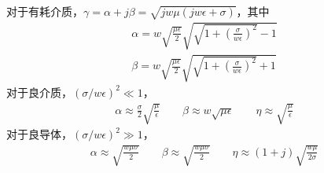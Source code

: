 \documentclass{article}
\numberwithin{equation}{section}
\begin{document}
对于有耗介质，$\gamma=\alpha+j\beta=\sqrt{jw\mu(jw\epsilon+\sigma)}$，其中
\begin{align}
    \label{eq:eq352}
    \alpha=w\sqrt{\frac{\mu\epsilon}{2}}\sqrt{\sqrt{1+\left(\frac{\sigma}{w\epsilon}\right)^2}-1} \\
    \label{eq:eq353}
    \beta=w\sqrt{\frac{\mu\epsilon}{2}}\sqrt{\sqrt{1+\left(\frac{\sigma}{w\epsilon}\right)^2}+1}
\end{align}
对于良介质，$(\sigma/w\epsilon)^2\ll 1$，
\begin{align}
    \label{eq:eq354}
    \alpha\approx\frac{\sigma}{2}\sqrt{\frac{\mu}{\epsilon}}\qquad\beta\approx w\sqrt{\mu\epsilon}\qquad\eta\approx\sqrt{\frac{\mu}{\epsilon}}
\end{align}
对于良导体，$(\sigma/w\epsilon)^2\gg 1$，
\begin{align}
    \label{eq:eq355}
    \alpha\approx\sqrt{\frac{w\mu\sigma}{2}}\qquad\beta\approx\sqrt{\frac{w\mu\sigma}{2}}\qquad\eta\approx(1+j)\sqrt{\frac{w\mu}{2\sigma}}
\end{align}
\end{document}
